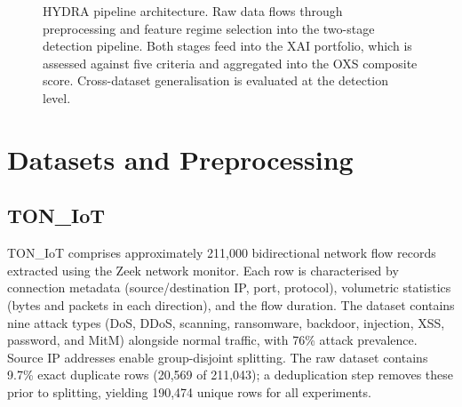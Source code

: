 \documentclass[12pt,a4paper]{report}
\begin{document}
\begin{figure}[H]
\caption{HYDRA pipeline architecture. Raw data flows through preprocessing and feature regime selection into the two-stage detection pipeline. Both stages feed into the XAI portfolio, which is assessed against five criteria and aggregated into the OXS composite score. Cross-dataset generalisation is evaluated at the detection level.}
\label{fig:pipeline}
\end{figure}

\section{Datasets and Preprocessing}
\label{sec:datasets}

\subsection{TON\_IoT}
\label{sec:toniot-meth}

TON\_IoT \cite{moustafa2021} comprises approximately 211,000 bidirectional network flow records extracted using the Zeek network monitor. Each row is characterised by connection metadata (source/destination IP, port, protocol), volumetric statistics (bytes and packets in each direction), and the flow duration. The dataset contains nine attack types (DoS, DDoS, scanning, ransomware, backdoor, injection, XSS, password, and MitM) alongside normal traffic, with 76\% attack prevalence. Source IP addresses enable group-disjoint splitting. The raw dataset contains 9.7\% exact duplicate rows (20,569 of 211,043); a deduplication step removes these prior to splitting, yielding 190,474 unique rows for all experiments.
\end{document}
